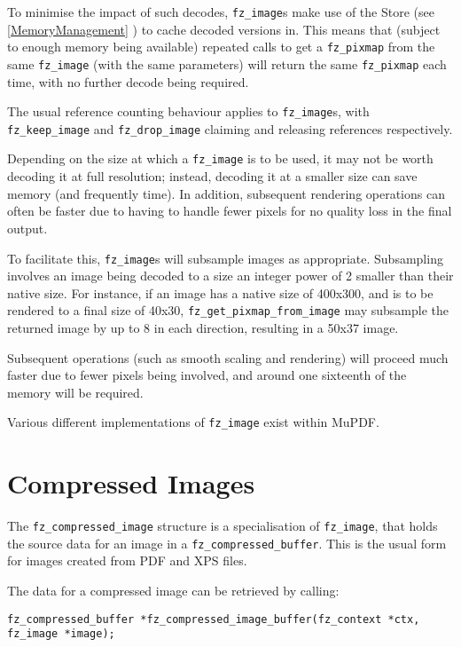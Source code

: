 \documentclass[oneside]{book}
\newcommand{\rjwref}[1] {\autoref{#1} \nameref{#1}}
\begin{document}
To minimise the impact of such decodes, \texttt{fz\_image}s make use of the Store (see \rjwref{MemoryManagement}) to cache decoded versions in.  This means that (subject to enough memory being available) repeated calls to get a \texttt{fz\_pixmap} from the same \texttt{fz\_image} (with the same parameters) will return the same \texttt{fz\_pixmap} each time, with no further decode being required.

The usual reference counting behaviour applies to \texttt{fz\_image}s, with \texttt{fz\_keep\_image} and \texttt{fz\_drop\_image} claiming and releasing references respectively.

Depending on the size at which a \texttt{fz\_image} is to be used, it may not be worth decoding it at full resolution; instead, decoding it at a smaller size can save memory (and frequently time). In addition, subsequent rendering operations can often be faster due to having to handle fewer pixels for no quality loss in the final output.

To facilitate this, \texttt{fz\_image}s will subsample images as appropriate. Subsampling involves an image being decoded to a size an integer power of 2 smaller than their native size. For instance, if an image has a native size of 400x300, and is to be rendered to a final size of 40x30, \texttt{fz\_get\_pixmap\_from\_image} may subsample the returned image by up to 8 in each direction, resulting in a 50x37 image.

Subsequent operations (such as smooth scaling and rendering) will proceed much faster due to fewer pixels being involved, and around one sixteenth of the memory will be required. 

Various different implementations of \texttt{fz\_image} exist within MuPDF.

\section{Compressed Images}

The \texttt{fz\_compressed\_image} structure is a specialisation of \texttt{fz\_image}, that holds the source data for an image in a \texttt{fz\_compressed\_buffer}. This is the usual form for images created from PDF and XPS files.

The data for a compressed image can be retrieved by calling:

\begin{lstlisting}
fz_compressed_buffer *fz_compressed_image_buffer(fz_context *ctx, fz_image *image);
\end{lstlisting}
\end{document}
